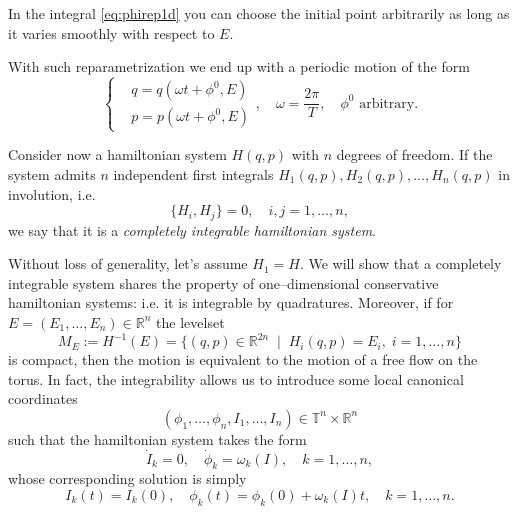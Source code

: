 \documentclass[english,fontsize=11pt,paper=a5,oneside]{scrbook}
\newcommand{\R}{\mathbb{R}}
\theoremstyle{definition}
\newenvironment{remark}
  {\pushQED{\qed}\renewcommand{\qedsymbol}{$\lozenge$}\remarkx}
  {\popQED\endremarkx}
\begin{document}
\begin{remark}
    In the integral \eqref{eq:phirep1d} you can choose the initial point arbitrarily as long as it varies smoothly with respect to $E$.
\end{remark}

With such reparametrization we end up with a periodic motion of the form
\begin{equation}
    \left\lbrace
    \begin{aligned}
        &q = q\left(\omega t + \phi^0, E\right)\\
        &p = p\left(\omega t + \phi^0, E\right)
    \end{aligned}
    \right., \quad \omega = \frac{2\pi}{T}, \quad \phi^0\mbox{ arbitrary}.
\end{equation}

\begin{tcolorbox}
Consider now a hamiltonian system $H(q,p)$ with $n$ degrees of freedom.
If the system admits $n$ independent first integrals $H_1(q,p), H_2(q,p), \ldots, H_n(q,p)$ in involution, i.e.
\begin{equation}
    \big\{H_i, H_j\big\} = 0,\quad i,j=1,\ldots,n,
\end{equation}
we say that it is a \emph{completely integrable hamiltonian system}.
\end{tcolorbox}

Without loss of generality, let's assume $H_1 = H$.
We will show that a completely integrable system shares the property of one--dimensional conservative hamiltonian systems: i.e. it is integrable by quadratures.
Moreover, if for $E = (E_1, \ldots, E_n)\in\R^n$ the levelset
\begin{equation}\label{eq:levelsetE}
    M_E := H^{-1}(E) = \big\{(q,p)\in\R^{2n} \;\mid\; H_i(q,p)=E_i,\;i=1,\ldots,n \big\}
\end{equation}
is compact, then the motion is equivalent to the motion of a free flow on the torus.
In fact, the integrability allows us to introduce some local canonical coordinates 
\begin{equation}\label{eq:actionalngle}
    (\phi_1, \ldots, \phi_n, I_1, \ldots, I_n) \in \mathbb{T}^n\times\R^n
\end{equation}
such that the hamiltonian system takes the form
\begin{equation}
    \dot I_k = 0, \quad \dot \phi_k = \omega_k(I), \quad k=1,\ldots,n,
\end{equation}
whose corresponding solution is simply
\begin{equation}
    I_k(t)= I_k(0), \quad
    \phi_k(t) = \phi_k(0) + \omega_k(I)t, \quad k = 1,\ldots, n.
\end{equation}
\end{document}
